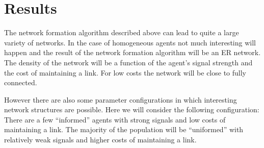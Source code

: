 \documentclass[10pt,a4paper]{article}
\begin{document}
\section{Results}
The network formation algorithm described above can lead to quite a large variety of networks. In the case of homogeneous agents not much interesting will happen and the result of the network formation algorithm will be an ER network. The density of the network will be a function of the agent's signal strength and the cost of maintaining a link. For low costs the network will be close to fully connected.

However there are also some parameter configurations in which interesting network structures are possible. Here we will consider the following configuration: There are a few ``informed'' agents with strong signals and low costs of maintaining a link. The majority of the population will be ``uniformed'' with relatively weak signals and higher costs of maintaining a link.
\end{document}
